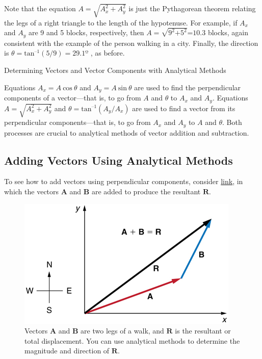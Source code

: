 \documentclass[
]{book}
\newenvironment{note}{}{}
\begin{document}
Note that the equation \(A = \sqrt{A_{x}^{2} + A_{y}^{2}}\) is just the
Pythagorean theorem relating the legs of a right triangle to the length
of the hypotenuse. For example, if \(A_{x}{}\) and \(A_{y}{}\) are 9 and 5
blocks, respectively, then
\({{A = \sqrt{9^{2}\text{+5}^{2}}}\text{=10}\text{.}3}{}\) blocks, again
consistent with the example of the person walking in a city. Finally,
the direction is \({\theta = \text{tan}^{–1}}(\text{5/9})=29.1º\) , as
before.

\hypertarget{fs-id1607685}{}
\begin{note}

Determining Vectors and Vector Components with Analytical Methods

Equations \({{A_{x} = A}\ \text{cos}\ \theta}{}\) and
\({{A_{y} = A}\ \text{sin}\ \theta}{}\) are used to find the perpendicular
components of a vector---that is, to go from \(A{}\) and \(\theta{}\) to
\(A_{x}{}\) and \(A_{y}{}\). Equations
\({A = \sqrt{A_{x}^{2} + A_{y}^{2}}}{}\) and
\({{\theta = \text{tan}^{\text{–1}}}({A_{y}/A_{x}})}{}\) are used to find
a vector from its perpendicular components---that is, to go from
\(A_{x}{}\) and \(A_{y}{}\) to \(A{}\) and \(\theta\). Both processes are
crucial to analytical methods of vector addition and subtraction.

\end{note}

\hypertarget{fs-id1461904}{}
\hypertarget{adding-vectors-using-analytical-methods}{%
\subsection{Adding Vectors Using Analytical Methods}\label{adding-vectors-using-analytical-methods}}

To see how to add vectors using perpendicular components, consider
\protect\hyperlink{import-auto-id1165298839640}{link}, in which
the vectors \(\mathbf{A}{}\) and \(\mathbf{B}{}\) are added to produce the
resultant \(\mathbf{R}{}\).

\begin{figure}
\hypertarget{import-auto-id1165298839640}{%
\centering
\includegraphics{images/Figure_03_03_05a.jpg}
\caption{Vectors \(\mathbf{A}{}\) and \(\mathbf{B}{}\) are two legs of a walk, and
\(\mathbf{R}{}\) is the resultant or total displacement. You can use
analytical methods to determine the magnitude and direction of
\(\mathbf{R}{}\).}\label{import-auto-id1165298839640}
}
\end{figure}
\end{document}
